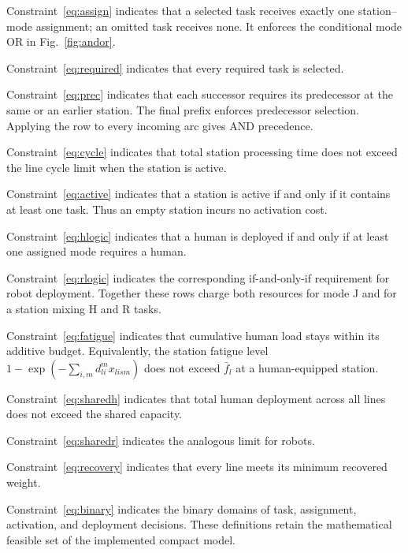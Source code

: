 Constraint~\eqref{eq:assign} indicates that a selected task receives exactly one station--mode assignment; an omitted task receives none. It enforces the conditional mode OR in Fig.~\ref{fig:andor}.

Constraint~\eqref{eq:required} indicates that every required task is selected.

Constraint~\eqref{eq:prec} indicates that each successor requires its predecessor at the same or an earlier station. The final prefix enforces predecessor selection. Applying the row to every incoming arc gives AND precedence.

Constraint~\eqref{eq:cycle} indicates that total station processing time does not exceed the line cycle limit when the station is active.

Constraint~\eqref{eq:active} indicates that a station is active if and only if it contains at least one task. Thus an empty station incurs no activation cost.

Constraint~\eqref{eq:hlogic} indicates that a human is deployed if and only if at least one assigned mode requires a human.

Constraint~\eqref{eq:rlogic} indicates the corresponding if-and-only-if requirement for robot deployment. Together these rows charge both resources for mode J and for a station mixing H and R tasks.

Constraint~\eqref{eq:fatigue} indicates that cumulative human load stays within its additive budget. Equivalently, the station fatigue level $1-\exp(-\sum_{i,m}d_{li}^{m}x_{lism})$ does not exceed $\bar f_l$ at a human-equipped station.

Constraint~\eqref{eq:sharedh} indicates that total human deployment across all lines does not exceed the shared capacity.

Constraint~\eqref{eq:sharedr} indicates the analogous limit for robots.

Constraint~\eqref{eq:recovery} indicates that every line meets its minimum recovered weight.

Constraint~\eqref{eq:binary} indicates the binary domains of task, assignment, activation, and deployment decisions. These definitions retain the mathematical feasible set of the implemented compact model.
